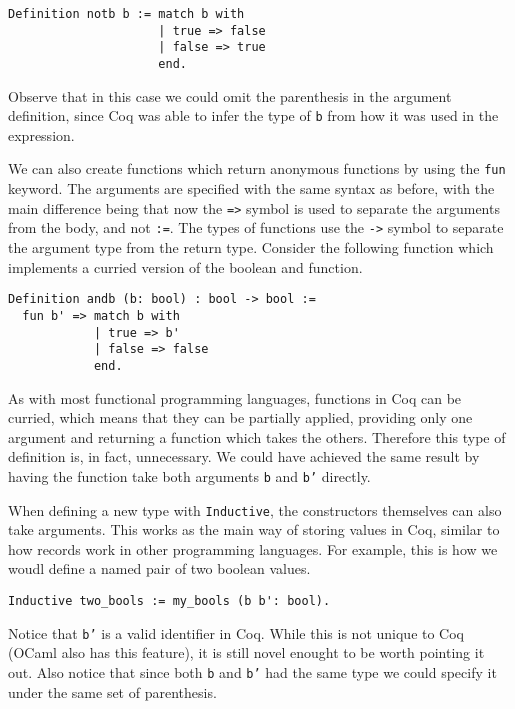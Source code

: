 \begin{verbatim}
Definition notb b := match b with 
                     | true => false
                     | false => true
                     end.
\end{verbatim}

Observe that in this case we could omit the parenthesis in the argument definition, since Coq was
able to infer the type of \texttt{b} from how it was used in the expression.

We can also create functions which return anonymous functions by using the \texttt{fun} 
keyword. The arguments are specified with the same syntax as before, with the main difference being 
that now the \texttt{=>} symbol is used to separate the arguments from the body, and not 
\texttt{:=}. The types of functions use the \texttt{->} symbol to separate the 
argument type from the return type. Consider the following function which implements a curried
version of the boolean and function.

\begin{verbatim}
Definition andb (b: bool) : bool -> bool :=
  fun b' => match b with 
            | true => b'
            | false => false
            end.
\end{verbatim}
\noindent As with most functional programming languages, functions in Coq can be curried, which means 
that they can be partially applied, providing only one argument and returning a function which takes 
the others. Therefore this type of definition is, in fact, unnecessary. We could have achieved the 
same result by having the function take both arguments \texttt{b} and \texttt{b'} 
directly.

When defining a new type with \texttt{Inductive}, the constructors themselves can also take 
arguments. This works as the main way of storing values in Coq, similar to how records work in other
programming languages. For example, this is how we woudl define a named pair of two boolean values.

\begin{verbatim}
Inductive two_bools := my_bools (b b': bool).
\end{verbatim}

Notice that \texttt{b'} is a valid identifier in Coq. While this is not unique to Coq (OCaml 
also has this feature), it is still novel enought to be worth pointing it out. Also notice that since 
both \texttt{b} and  \texttt{b'} had the same type we could specify it under the 
same set of parenthesis.

